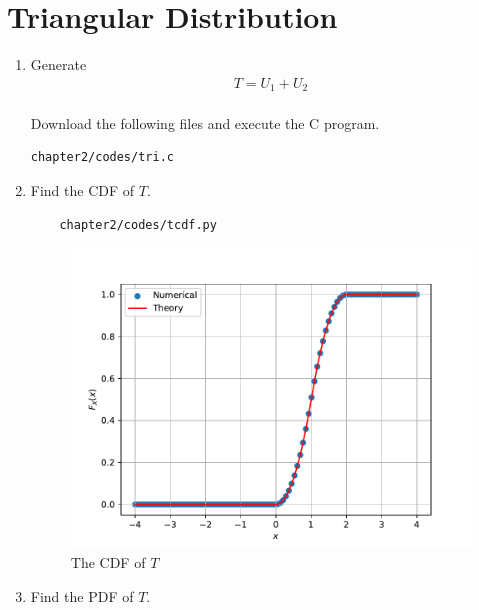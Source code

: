 \section{Triangular Distribution}
%
\begin{enumerate}
\item Generate 
	\begin{align}
		T = U_1+U_2
	\end{align}\\
\solution Download the following files and execute the  C program.
\begin{lstlisting}
chapter2/codes/tri.c
\end{lstlisting}
\item Find the CDF of $T$.\\
\solution 
\begin{lstlisting}
	chapter2/codes/tcdf.py
\end{lstlisting}
\begin{figure}[H]
\centering
\includegraphics[scale=0.8]{chapter2/figs/triangle_cdf.pdf}
\caption{The CDF of $T$}
\label{fig:tri_cdf}
\end{figure}
\item Find the PDF of $T$.\\


\end{enumerate}
